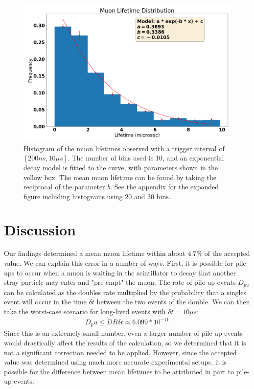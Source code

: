 \documentclass[
 reprint,
 twocolumn,
 amsmath,amssymb,
 aps,
 pra,
 floatfix,
]{revtex4-1}
\begin{document}
\begin{figure}
    \includegraphics[width=0.9\columnwidth]{hist.png}
    \centering
    \caption{Histogram of the muon lifetimes observed with a trigger interval
             of $[200ns,10 \mu s]$. The number of bins used is 10, and an
             exponential decay model is fitted to the curve, with parameters
             shown in the yellow box. The mean muon lifetime can be found by
             taking the reciprocal of the parameter $b$. See the appendix for
             the expanded figure including histograms using 20 and 30 bins.}
\end{figure}

\section{Discussion}

Our findings determined a mean muon lifetime within about $4.7\%$
of the accepted value. We can explain this error in a number of ways. First,
it is possible for pile-ups to occur when a muon is waiting in the scintillator
to decay that another stray particle may enter and "pre-empt" the muon.
The rate of pile-up events $D_{pu}$ can be calculated as the doubles rate
multiplied by the probability that a singles event will occur in the time
$\delta t$ between the two events of the double. We can then take the
worst-case scenario for long-lived events with $\delta t = 10 \mu s$:
\begin{align}
    D_pu \leq D R \delta t \approx 6.099 * 10^{-11}
\end{align}
Since this is an extremely small number, even a larger number of pile-up
events would drastically affect the results of the calculation, so we determined
that it is not a significant correction needed to be applied. However, since
the accepted value was determined using much more accurate experimental setups,
it is possible for the difference between mean lifetimes to be attributed in
part to pile-up events.
\end{document}
